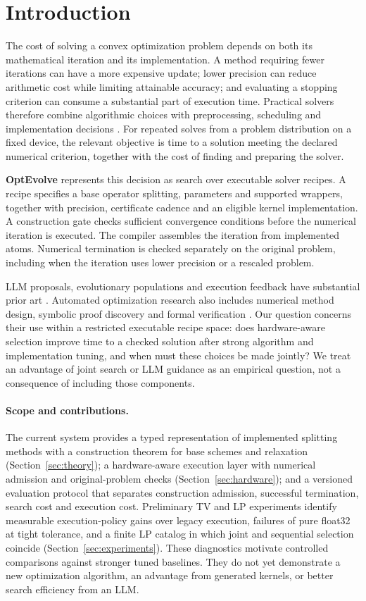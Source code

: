 \section{Introduction}

The cost of solving a convex optimization problem depends on both its
mathematical iteration and its implementation. A method requiring fewer
iterations can have a more expensive update; lower precision can reduce
arithmetic cost while limiting attainable accuracy; and evaluating a stopping
criterion can consume a substantial part of execution time. Practical solvers
therefore combine algorithmic choices with preprocessing, scheduling and
implementation decisions \citep{Applegate2021Practical,Stellato2020OSQP}.
For repeated solves from a problem distribution on a fixed device, the
relevant objective is time to a solution meeting the declared numerical
criterion, together with the cost of finding and preparing the solver.

\textbf{OptEvolve} represents this decision as search over executable solver
recipes. A recipe specifies a base operator splitting, parameters and supported
wrappers, together with precision, certificate cadence and an eligible kernel
implementation. A construction gate checks sufficient convergence conditions
before the numerical iteration is executed. The compiler assembles the
iteration from implemented atoms. Numerical termination is checked separately
on the original problem, including when the iteration uses lower precision
or a rescaled problem.

LLM proposals, evolutionary populations and execution feedback have substantial
prior art \citep{RomeraParedes2023Mathematical,Ye2024ReEvo,Agrawal2025GEPA}.
Automated optimization research also includes numerical method design,
symbolic proof discovery and formal verification \citep{Kim2026AutoOPT}.
Our question concerns their use within a restricted executable recipe space:
does hardware-aware selection improve time to a checked solution after strong
algorithm and implementation tuning, and when must these choices be made
jointly? We treat an advantage of joint search or LLM guidance as an empirical
question, not a consequence of including those components.

\paragraph{Scope and contributions.}
The current system provides a typed representation of implemented splitting
methods with a construction theorem for base schemes and relaxation
(Section~\ref{sec:theory}); a hardware-aware execution layer with numerical
admission and original-problem checks (Section~\ref{sec:hardware}); and a
versioned evaluation protocol that separates construction admission, successful
termination, search cost and execution cost. Preliminary TV and LP experiments
identify measurable execution-policy gains over legacy execution, failures of
pure float32 at tight tolerance, and a finite LP catalog in which joint and
sequential selection coincide (Section~\ref{sec:experiments}). These diagnostics
motivate controlled comparisons against stronger tuned baselines. They do not
yet demonstrate a new optimization algorithm, an advantage from generated
kernels, or better search efficiency from an LLM.

